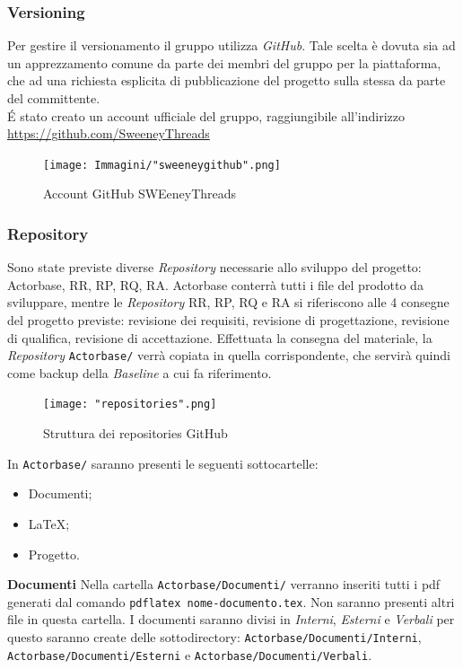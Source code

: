 \documentclass[a4paper]{article}
\begin{document}
	\subsubsection{Versioning}
	Per gestire il versionamento il gruppo utilizza \emph{GitHub}. Tale scelta è dovuta sia ad un apprezzamento
	comune da parte dei membri del gruppo per la piattaforma, che ad una richiesta esplicita di pubblicazione del
	progetto sulla stessa da parte del committente. \\
	\'E stato creato un account ufficiale del gruppo, raggiungibile all'indirizzo
	\url{https://github.com/SweeneyThreads}
	\begin{figure}[H]
		\centering
		\texttt{[image: Immagini/"sweeneygithub".png]}
		\caption{Account GitHub SWEeneyThreads}
	\end{figure}
	\subsubsection{Repository}
	Sono state previste diverse \emph{Repository} necessarie allo sviluppo del progetto: Actorbase,
	RR, RP, RQ, RA. 	Actorbase conterrà tutti i file del prodotto da sviluppare, mentre le
	 \emph{Repository} RR, RP, RQ e RA si riferiscono alle 4 consegne del progetto previste:
	 revisione dei requisiti, revisione di progettazione, revisione di qualifica, revisione di
	  accettazione. Effettuata la consegna del materiale, la \emph{Repository}
	  \verb|Actorbase/| verrà copiata in quella corrispondente, che servirà quindi come
	  backup della \emph{Baseline} a cui fa riferimento.
  	\begin{figure}[H]
		\centering
		\texttt{[image: "repositories".png]}
		\caption{Struttura dei repositories GitHub}
	\end{figure}
	In \verb|Actorbase/| saranno presenti le seguenti sottocartelle:
	\begin{itemize}
		\item Documenti;
		\item LaTeX;
		\item Progetto.
	\end{itemize}
	\textbf{Documenti}
	Nella cartella \verb|Actorbase/Documenti/| verranno inseriti tutti i pdf generati dal comando \verb|pdflatex nome-documento.tex|. Non
	saranno presenti altri file in questa cartella. I documenti saranno divisi in \emph{Interni}, \emph{Esterni} e
	\emph{Verbali} per questo saranno create delle sottodirectory: \verb|Actorbase/Documenti/Interni|, \verb|Actorbase/Documenti/Esterni|
	e \verb|Actorbase/Documenti/Verbali|.
\end{document}
